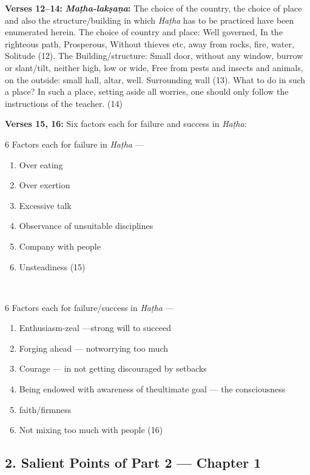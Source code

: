\textbf{Verses 12--14:} \textbf{\textit{Maṭha-lakṣaṇa}:} The choice of the country, the choice of place and also the structure/building in which \textit{Haṭha} has to be practiced have been enumerated herein.  The choice of country and place: Well governed, In the righteous path, Prosperous, Without thieves etc, away from rocks, fire, water, Solitude (12). The Building/structure: Small door, without any window, burrow or slant/tilt, neither high, low or wide, Free from pests and insects and animals, on the outside: small hall, altar, well. Surrounding wall (13). What to do in such a place?  In such a place, setting aside all worries, one should only follow the instructions of the teacher. (14)

\newpage

\textbf{Verses 15, 16:} Six factors each for failure and success in \textit{Haṭha}: 

\noindent
\begin{minipage}[t]{.45\linewidth}
6 Factors each for failure in \textit{Haṭha} ---
\begin{enumerate}
\item Over eating 
\item Over exertion 
\item Excessive talk
\item Observance of unsuitable disciplines 
\item Company with people 
\item Unsteadiness  (15)
\end{enumerate}
\end{minipage}
\smallskip~
\begin{minipage}[t]{.45\linewidth}
6 Factors each for failure/success in \textit{Haṭha} ---
\begin{enumerate}
\item Enthusiasm-zeal ---\hfil\break  strong will to succeed 
\item Forging ahead --- not\break worrying too much 
\item Courage --- in not getting discouraged by setbacks
\item Being  endowed with awareness of the\break ultimate goal --- the consciousness  
\item faith/firmness 
\item Not mixing too much with people (16) 
\end{enumerate}
\end{minipage}

\subsection*{2. Salient Points of Part 2 --- Chapter 1}

